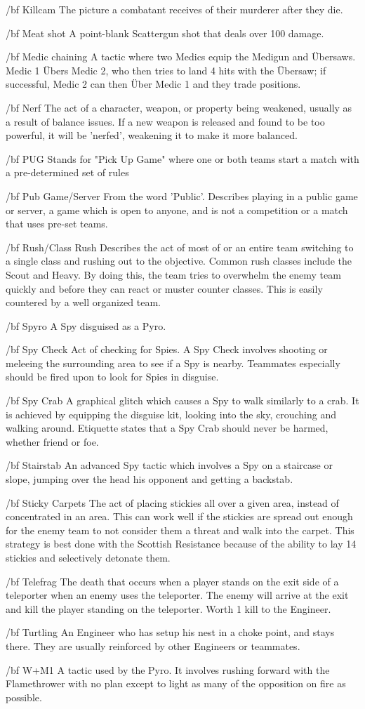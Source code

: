 {/bf Killcam} The picture a combatant receives of their murderer after they die.
 
{/bf Meat shot} A point-blank Scattergun shot that deals over 100 damage.

{/bf Medic} chaining A tactic where two Medics equip the Medigun and Übersaws. Medic 1 Übers Medic 2, who then tries to land 4 hits with the Übersaw; if successful, Medic 2 can then Über Medic 1 and they trade positions.

{/bf Nerf} The act of a character, weapon, or property being weakened, usually as a result of balance issues. If a new weapon is released and found to be too powerful, it will be 'nerfed', weakening it to make it more balanced.

{/bf PUG} Stands for "Pick Up Game" where one or both teams start a match with a pre-determined set of rules

{/bf Pub Game/Server} From the word 'Public'. Describes playing in a public game or server, a game which is open to anyone, and is not a competition or a match that uses pre-set teams.

{/bf Rush/Class Rush} Describes the act of most of or an entire team switching to a single class and rushing out to the objective. Common rush classes include the Scout and Heavy. By doing this, the team tries to overwhelm the enemy team quickly and before they can react or muster counter classes. This is easily countered by a well organized team.

{/bf Spyro} A Spy disguised as a Pyro.

{/bf Spy Check} Act of checking for Spies. A Spy Check involves shooting or meleeing the surrounding area to see if a Spy is nearby.  Teammates especially should be fired upon to look for Spies in disguise.

{/bf Spy Crab} A graphical glitch which causes a Spy to walk similarly to a crab. It is achieved by equipping the disguise kit, looking into the sky, crouching and walking around. Etiquette states that a Spy Crab should never be harmed, whether friend or foe.

{/bf Stairstab} An advanced Spy tactic which involves a Spy on a staircase or slope, jumping over the head his opponent and getting a backstab.

{/bf Sticky Carpets} The act of placing stickies all over a given area, instead of concentrated in an area. This can work well if the stickies are spread out enough for the enemy team to not consider them a threat and walk into the carpet. This strategy is best done with the Scottish Resistance because of the ability to lay 14 stickies and selectively detonate them.

{/bf Telefrag} The death that occurs when a player stands on the exit side of a teleporter when an enemy uses the teleporter. The enemy will arrive at the exit and kill the player standing on the teleporter. Worth 1 kill to the Engineer. 

{/bf Turtling} An Engineer who has setup his nest in a choke point, and stays there. They are usually reinforced by other Engineers or teammates.

{/bf W+M1} A tactic used by the Pyro. It involves rushing forward with the Flamethrower with no plan except to light as many of the opposition on fire as possible.
